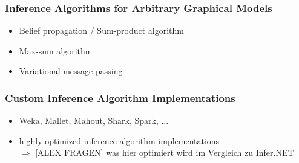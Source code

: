 \subsubsection{Inference Algorithms for Arbitrary Graphical Models}

\begin{itemize}
\item Belief propagation / Sum-product algorithm
\item Max-sum algorithm
\item Variational message passing
\end{itemize}

\subsubsection{Custom Inference Algorithm Implementations}

\begin{itemize}
\item Weka, Mallet, Mahout, Shark, Spark, ...
\item highly optimized inference algorithm implementations\\
$\Rightarrow$ [ALEX FRAGEN] was hier optimiert wird im Vergleich zu Infer.NET
\end{itemize}

